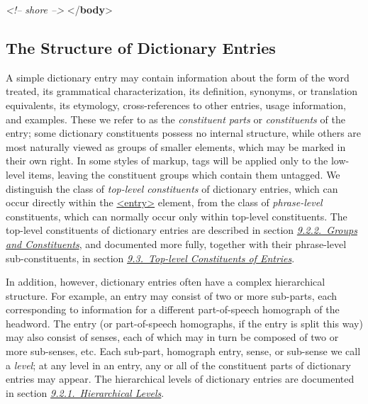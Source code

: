 \begin{shaded}
\textit{<!-- shore -->}\mbox{}\newline 
\hspace*{1em}\hspace*{1em}\mbox{}\newline 
\hspace*{1em}\mbox{}\newline 
{}\mbox{}\newline 
{</\textbf{body}>}\end{shaded}\egroup\par 
\subsection[{The Structure of Dictionary Entries}]{The Structure of Dictionary Entries}\label{DIEN}\par
A simple dictionary entry may contain information about the form of the word treated, its grammatical characterization, its definition, synonyms, or translation equivalents, its etymology, cross-references to other entries, usage information, and examples. These we refer to as the \textit{constituent parts} or \textit{constituents} of the entry; some dictionary constituents possess no internal structure, while others are most naturally viewed as groups of smaller elements, which may be marked in their own right. In some styles of markup, tags will be applied only to the low-level items, leaving the constituent groups which contain them untagged. We distinguish the class of \textit{top-level constituents} of dictionary entries, which can occur directly within the \hyperref[TEI.entry]{<entry>} element, from the class of \textit{phrase-level} constituents, which can normally occur only within top-level constituents. The top-level constituents of dictionary entries are described in section \textit{\hyperref[DIENGP]{9.2.2.\ Groups and Constituents}}, and documented more fully, together with their phrase-level sub-constituents, in section \textit{\hyperref[DITP]{9.3.\ Top-level Constituents of Entries}}.\par
In addition, however, dictionary entries often have a complex hierarchical structure. For example, an entry may consist of two or more sub-parts, each corresponding to information for a different part-of-speech homograph of the headword. The entry (or part-of-speech homographs, if the entry is split this way) may also consist of senses, each of which may in turn be composed of two or more sub-senses, etc. Each sub-part, homograph entry, sense, or sub-sense we call a \textit{level}; at any level in an entry, any or all of the constituent parts of dictionary entries may appear. The hierarchical levels of dictionary entries are documented in section \textit{\hyperref[DIENHI]{9.2.1.\ Hierarchical Levels}}.
